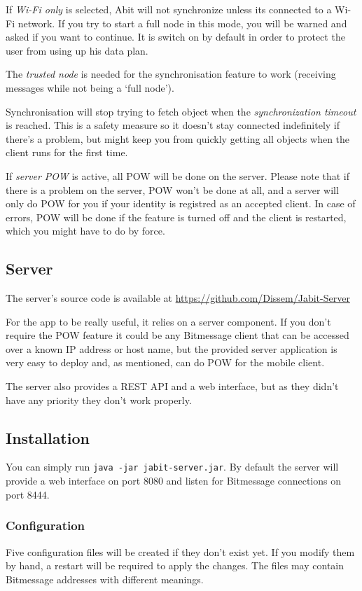 \documentclass{bfh}
\begin{document}
  If \textit{Wi-Fi only} is selected, Abit will not synchronize unless its connected to a Wi-Fi network. If you try to start a full node in this mode, you will be warned and asked if you want to continue. It is switch on by default in order to protect the user from using up his data plan.

  The \textit{trusted node} is needed for the synchronisation feature to work (receiving messages while not being a `full node').

  Synchronisation will stop trying to fetch object when the \textit{synchronization timeout} is reached. This is a safety measure so it doesn't stay connected indefinitely if there's a problem, but might keep you from quickly getting all objects when the client runs for the first time.

  If \textit{server POW} is active, all \ac{POW} will be done on the server. Please note that if there is a problem on the server, \ac{POW} won't be done at all, and a server will only do \ac{POW} for you if your identity is registred as an accepted client. In case of errors, \ac{POW} will be done if the feature is turned off and the client is restarted, which you might have to do by force.


  \subsection{Server}
  The server's source code is available at \url{https://github.com/Dissem/Jabit-Server}

  For the app to be really useful, it relies on a server component. If you don't require the \ac{POW} feature it could be any Bitmessage client that can be accessed over a known \acs{IP} address or host name, but the provided server application is very easy to deploy and, as mentioned, can do \ac{POW} for the mobile client.

  The server also provides a \acs{REST} \ac{API} and a web interface, but as they didn't have any priority they don't work properly.

  \subsection{Installation}
  You can simply run \texttt{java -jar jabit-server.jar}. By default the server will provide a web interface on port 8080 and listen for Bitmessage connections on port 8444.

  \subsubsection{Configuration}
  Five configuration files will be created if they don't exist yet. If you modify them by hand, a restart will be required to apply the changes. The files may contain Bitmessage addresses with different meanings.
\end{document}
